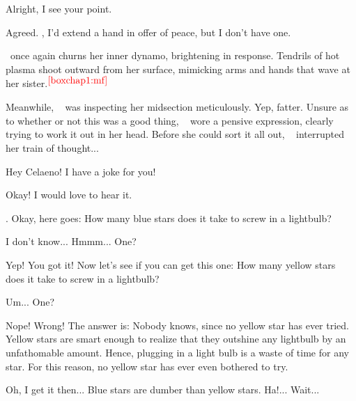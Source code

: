 \documentclass[main.tex]{subfiles}
\begin{document}
\par \Celaeno Alright, I see your point.

\par \Taygete Agreed.  \rmalcyone, I'd extend a hand in offer of peace, but I don't have one.

\par \nar \rmtaygete~once again churns her inner dynamo, brightening in response.  Tendrils of hot plasma shoot outward from her surface, mimicking arms and hands that wave at her sister.$^{\textcolor{red}{\ref{boxchap1:mf}}}$

\par \nar Meanwhile, \rmcelaeno~ was inspecting her midsection meticulously.  Yep, fatter.  Unsure as to whether or not this was a good thing, \rmcelaeno~ wore a pensive expression, clearly trying to work it out in her head.  Before she could sort it all out, \rmtaygete~ interrupted her train of thought...

\par \Taygete Hey Celaeno!  I have a joke for you!

\par \Celaeno Okay!  I would love to hear it.

\par \Taygete. Okay, here goes:  How many blue stars does it take to screw in a lightbulb?

\par \Celaeno I don't know... Hmmm... One?

\par \Taygete Yep!  You got it!  Now let's see if you can get this one:  How many yellow stars does it take to screw in a lightbulb?

\par \Celaeno Um... One?

\par \Taygete Nope!  Wrong!  The answer is:  Nobody knows, since no yellow star has ever tried.  Yellow stars are smart enough to realize that they outshine any lightbulb by an unfathomable amount.   Hence, plugging in a light bulb is a waste of time for any star. For this reason, no yellow star has ever even bothered to try. 

\par \Celaeno Oh, I get it then...  Blue stars are dumber than yellow stars.  Ha!...  Wait...
\end{document}
